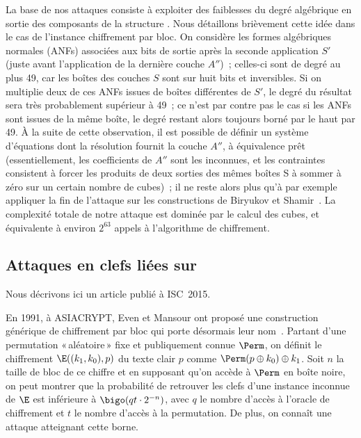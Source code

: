 La base de nos attaques consiste à exploiter des faiblesses du degré algébrique en sortie des composants de la structure \asasa. Nous détaillons brièvement cette idée dans le cas de l'instance
chiffrement par bloc. On considère les formes algébriques normales (ANFs) associées aux bits de sortie après la seconde application $S'$ (juste avant l'application de la dernière couche $A''$)~;
celles-ci sont de degré au plus 49, car les boîtes des couches $S$ sont sur huit bits et inversibles. Si on multiplie deux de ces ANFs issues de boîtes différentes de $S'$, le degré du résultat
sera très probablement supérieur à 49~; ce n'est par contre pas le cas si les ANFs sont issues de la même boîte, le degré restant alors toujours borné par le haut par 49.
À la suite de cette observation, il est possible de définir un système d'équations dont la résolution fournit la couche $A''$, à équivalence prêt (essentiellement,
les coefficients de $A''$ sont les inconnues, et les contraintes consistent à forcer les produits de deux sorties des mêmes boîtes S à sommer à zéro sur un certain nombre de cubes)~; il ne reste alors plus qu'à par exemple
appliquer la fin de l'attaque sur les constructions \sasas de Biryukov et Shamir~\cite{DBLP:conf/eurocrypt/BiryukovS01}. La complexité totale de notre attaque est dominée par le calcul
des cubes, et équivalente à environ $2^{63}$ appels à l'algorithme de chiffrement.

\subsection{Attaques en clefs liées sur \proestotr \cite{DBLP:conf/isw/Karpman15}}

Nous décrivons ici un article publié à ISC~2015.

\medskip

En 1991, à ASIACRYPT, Even et Mansour ont proposé une construction générique de chiffrement par bloc qui porte désormais leur nom~\cite{EM}. Partant d'une permutation «\,aléatoire\,» fixe
et publiquement connue $\Perm$, on définit le chiffrement $\E((k_1,k_0),p)$ du texte clair $p$ comme $\Perm(p \oplus k_0) \oplus k_1$. Soit $n$ la taille de bloc de ce chiffre
et en supposant qu'on accède à $\Perm$ en boîte noire, on peut montrer que la probabilité de retrouver les clefs d'une instance inconnue de $\E$ est inférieure à
$\bigo(qt \cdot 2^{-n})$, avec $q$ le nombre d'accès à l'oracle de chiffrement et $t$ le nombre d'accès à la permutation. De plus, on connaît une attaque atteignant cette borne.

